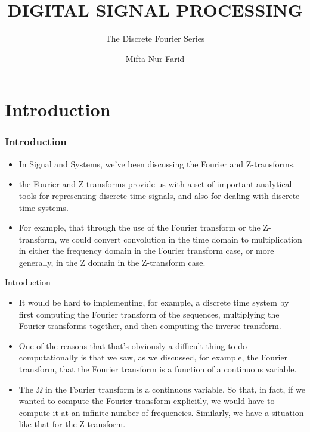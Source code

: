 \documentclass[pdflatex,compress,mathserif]{beamer}
\title{DIGITAL SIGNAL PROCESSING}
\subtitle{The Discrete Fourier Series}
\author{Mifta Nur Farid}
\begin{document}
\maketitle

\section{Introduction}

\begin{frame}
	\frametitle{Introduction}
	\begin{itemize}
		\item In Signal and Systems, we've been discussing the Fourier and Z-transforms.
		\item the Fourier and Z-transforms provide us with a set of important 		analytical tools for representing discrete time signals, and also for dealing with discrete time systems.
		\item For example, that through the use of the Fourier transform or the Z-transform, we could convert convolution in the time domain to multiplication in either the frequency domain in the Fourier transform case, or more generally, in the Z domain in the Z-transform case.
	\end{itemize}
\end{frame}

\begin{frame}{Introduction}
	\begin{itemize}
		\item It would be hard to implementing, for example, a discrete time system by first computing the Fourier transform of the sequences, multiplying the Fourier transforms together, and then computing the inverse transform.
		\item One of the reasons that that's obviously a difficult thing to do computationally is that we saw, as we discussed, for example, the Fourier transform, that the Fourier transform is a function of a continuous variable.
		\item The $ \Omega $ in the Fourier transform is a continuous variable. So
		that, in fact, if we wanted to compute the Fourier transform explicitly, we would have to compute it at an infinite number of frequencies. Similarly, we have a situation like that for the Z-transform.
	\end{itemize}
\end{frame}
\end{document}
